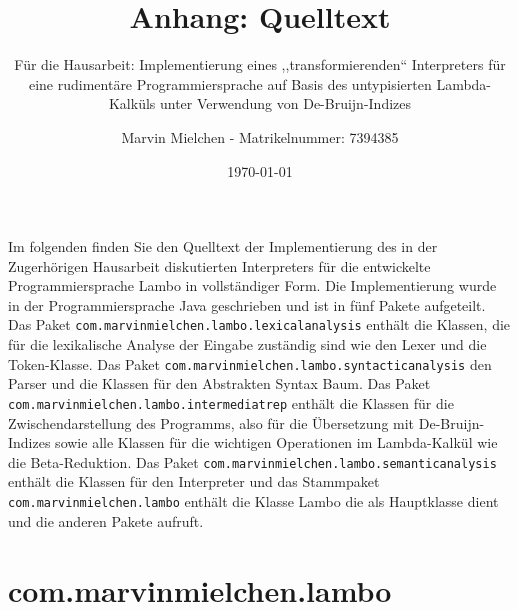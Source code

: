 \documentclass[ngerman]{article}
\title{Anhang: Quelltext}
\author{Marvin Mielchen - Matrikelnummer: 7394385}
\subtitle{Für die Hausarbeit: Implementierung eines ,,transformierenden“ Interpreters für eine rudimentäre Programmiersprache auf Basis des untypisierten Lambda-Kalküls unter Verwendung von De-Bruijn-Indizes}
\date{\today}
\begin{document}
\maketitle

Im folgenden finden Sie den Quelltext der Implementierung des in der Zugerhörigen Hausarbeit diskutierten Interpreters für die entwickelte Programmiersprache Lambo in vollständiger Form. Die Implementierung wurde in der Programmiersprache Java geschrieben und ist in fünf Pakete aufgeteilt. Das Paket \texttt{com.marvinmielchen.lambo.lexicalanalysis} enthält die Klassen, die für die lexikalische Analyse der Eingabe zuständig sind wie den Lexer und die Token-Klasse. Das Paket \texttt{com.marvinmielchen.lambo.syntacticanalysis} den Parser und die Klassen für den Abstrakten Syntax Baum. Das Paket \texttt{com.marvinmielchen.lambo.intermediatrep} enthält die Klassen für die Zwischendarstellung des Programms, also für die Übersetzung mit De-Bruijn-Indizes sowie alle Klassen für die wichtigen Operationen im Lambda-Kalkül wie die Beta-Reduktion. Das Paket \texttt{com.marvinmielchen.lambo.semanticanalysis} enthält die Klassen für den Interpreter und das Stammpaket \texttt{com.marvinmielchen.lambo} enthält die Klasse Lambo die als Hauptklasse dient und die anderen Pakete aufruft.

\newpage
\section{com.marvinmielchen.lambo}


\end{document}
